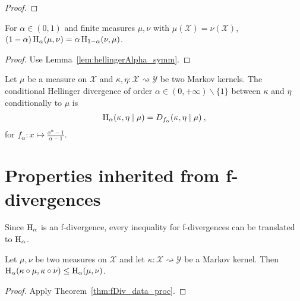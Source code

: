 \begin{proof}\leanok
\uses{}
\end{proof}

\begin{lemma}
  \label{lem:hellingerAlpha_symm}
  \leanok
  For $\alpha \in (0, 1)$ and finite measures $\mu, \nu$ with $\mu(\mathcal X) = \nu(\mathcal X)$, $(1 - \alpha) \operatorname{H}_\alpha(\mu, \nu) = \alpha \operatorname{H}_{1 - \alpha}(\nu, \mu)$.
\end{lemma}

\begin{proof}\leanok
{}
Use Lemma~\ref{lem:hellingerAlpha_symm}.
\end{proof}


\begin{definition}
  \label{def:condHellingerAlpha}
  Let $\mu$ be a measure on $\mathcal X$ and $\kappa, \eta : \mathcal X \rightsquigarrow \mathcal Y$ be two Markov kernels. The conditional Hellinger divergence of order $\alpha \in (0,+\infty) \backslash \{1\}$ between $\kappa$ and $\eta$ conditionally to $\mu$ is
  \begin{align*}
  \operatorname{H}_\alpha(\kappa, \eta \mid \mu) = D_{f_\alpha}(\kappa, \eta \mid \mu) \: ,
  \end{align*}
  for $f_\alpha : x \mapsto \frac{x^{\alpha} - 1}{\alpha - 1}$.
\end{definition}


\section{Properties inherited from f-divergences}

Since $\operatorname{H}_\alpha$ is an f-divergence, every inequality for f-divergences can be translated to $\operatorname{H}_\alpha$.

\begin{theorem}
  \label{thm:hellingerAlpha_data_proc}
  Let $\mu, \nu$ be two measures on $\mathcal X$ and let $\kappa : \mathcal X \rightsquigarrow \mathcal Y$ be a Markov kernel.
  Then $\operatorname{H}_\alpha(\kappa \circ \mu, \kappa \circ \nu) \le \operatorname{H}_\alpha(\mu, \nu)$.
\end{theorem}

\begin{proof}
Apply Theorem~\ref{thm:fDiv_data_proc}.
\end{proof}

